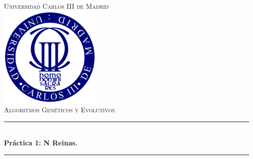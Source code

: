 \documentclass[12pt]{article}
\begin{document}
\begin{titlepage}

\newcommand{\HRule}{\rule{\linewidth}{0.5mm}} %

\center %


\textsc{\LARGE Universidad Carlos III de Madrid}\\[1cm] %


\includegraphics[width=50mm]{uc3m_logo}\\[1cm] %

\textsc{\Large Algoritmos Genéticos y Evolutivos}\\[0.5cm] %


\HRule \\[0.4cm]
{ \huge \bfseries Práctica 1: N Reinas.}\\[0.4cm] %
\HRule \\[2cm]




\end{titlepage}
\end{document}

